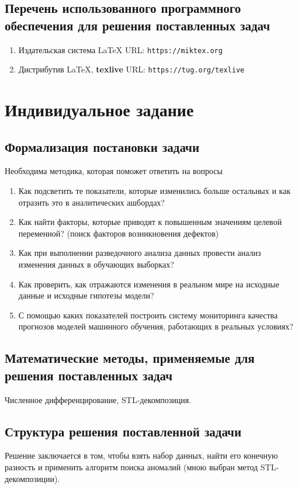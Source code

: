 \documentclass[14pt,Otchet]{diplomwork}
\begin{document}
\section{Перечень использованного программного обеспечения  для решения поставленных задач}
	\label{sec:Soft}
	\begin{enumerate}
	\item
		Издательская система \LaTeX{} URL: \verb"https://miktex.org"
	\item
		Дистрибутив \LaTeX, \textbf{texlive}  URL: \verb"https://tug.org/texlive"
	\end{enumerate}

\chapter{Индивидуальное задание}

\section{Формализация постановки задачи}
Необходима методика, которая поможет ответить на вопросы
	\begin{enumerate}
	\item
		Как подсветить те показатели, которые изменились больше остальных
		и как отразить это в аналитических ашбордах?
	\item
		Как найти факторы, которые приводят к повышенным значениям целевой переменной?
		(поиск факторов возникновения дефектов)
	\item
		Как при выполнении разведочного анализа данных провести анализ
		изменения данных в обучающих выборках?
	\item
		Как проверить, как отражаются изменения в реальном мире на
		исходные данные и исходные гипотезы модели?
	\item
		С помощью каких показателей построить систему мониторинга качества прогнозов
		моделей машинного обучения, работающих в реальных условиях?
	\end{enumerate}

\section{Математические методы, применяемые для решения поставленных задач}
Численное дифференцирование, STL-декомпозиция.
\section{Структура решения поставленной задачи}
Решение заключается в том, чтобы взять набор данных, найти его конечную разность и применить
алгоритм поиска аномалий (мною выбран метод STL-декомпозиции).
\end{document}
